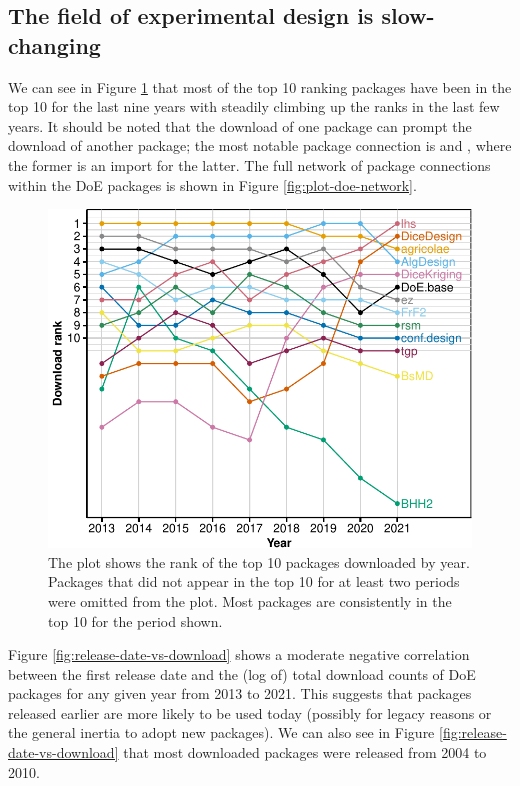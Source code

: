 \hypertarget{the-field-of-experimental-design-is-slow-changing}{%
\subsection{The field of experimental design is slow-changing}\label{the-field-of-experimental-design-is-slow-changing}}

We can see in Figure \ref{fig:rank-over-time} that most of the top 10 ranking packages have been in the top 10 for the last nine years with  steadily climbing up the ranks in the last few years. It should be noted that the download of one package can prompt the download of another package; the most notable package connection is  and , where the former is an import for the latter. The full network of package connections within the DoE packages is shown in Figure \ref{fig:plot-doe-network}.

\begin{figure}[htbp]

{\centering \includegraphics{figures/rank-over-time-1} 

}

\caption{The plot shows the rank of the top 10 packages downloaded by year. Packages that did not appear in the top 10 for at least two periods were omitted from the plot. Most packages are consistently in the top 10 for the period shown.}\label{fig:rank-over-time}
\end{figure}

Figure \ref{fig:release-date-vs-download} shows a moderate negative correlation between the first release date and the (log of) total download counts of DoE packages for any given year from 2013 to 2021. This suggests that packages released earlier are more likely to be used today (possibly for legacy reasons or the general inertia to adopt new packages). We can also see in Figure \ref{fig:release-date-vs-download} that most downloaded packages were released from 2004 to 2010.

